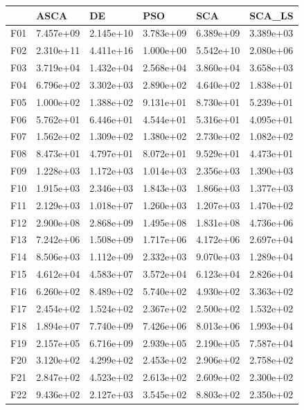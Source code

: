 \begin{tabular}{llllll}
\toprule
{} &       ASCA &         DE &        PSO &        SCA &     SCA\_LS \\
\midrule
F01  &  7.457e+09 &  2.145e+10 &  3.783e+09 &  6.389e+09 &  3.389e+03 \\
F02  &  2.310e+11 &  4.411e+16 &  1.000e+00 &  5.542e+10 &  2.080e+06 \\
F03  &  3.719e+04 &  1.432e+04 &  2.568e+04 &  3.860e+04 &  3.658e+03 \\
F04  &  6.796e+02 &  3.302e+03 &  2.890e+02 &  4.640e+02 &  1.838e+01 \\
F05  &  1.000e+02 &  1.388e+02 &  9.131e+01 &  8.730e+01 &  5.239e+01 \\
F06  &  5.762e+01 &  6.446e+01 &  4.544e+01 &  5.316e+01 &  4.095e+01 \\
F07  &  1.562e+02 &  1.309e+02 &  1.380e+02 &  2.730e+02 &  1.082e+02 \\
F08  &  8.473e+01 &  4.797e+01 &  8.072e+01 &  9.529e+01 &  4.473e+01 \\
F09  &  1.228e+03 &  1.172e+03 &  1.014e+03 &  2.356e+03 &  1.390e+03 \\
F10  &  1.915e+03 &  2.346e+03 &  1.843e+03 &  1.866e+03 &  1.377e+03 \\
F11  &  2.129e+03 &  1.018e+07 &  1.260e+03 &  1.207e+03 &  1.470e+02 \\
F12  &  2.900e+08 &  2.868e+09 &  1.495e+08 &  1.831e+08 &  4.736e+06 \\
F13  &  7.242e+06 &  1.508e+09 &  1.717e+06 &  4.172e+06 &  2.697e+04 \\
F14  &  8.506e+03 &  1.112e+09 &  2.332e+03 &  9.070e+03 &  1.289e+04 \\
F15  &  4.612e+04 &  4.583e+07 &  3.572e+04 &  6.123e+04 &  2.826e+04 \\
F16  &  6.260e+02 &  8.489e+02 &  5.740e+02 &  4.930e+02 &  3.363e+02 \\
F17  &  2.454e+02 &  1.524e+02 &  2.367e+02 &  2.500e+02 &  1.532e+02 \\
F18  &  1.894e+07 &  7.740e+09 &  7.426e+06 &  8.013e+06 &  1.993e+04 \\
F19  &  2.157e+05 &  6.716e+09 &  2.939e+05 &  2.190e+05 &  7.587e+04 \\
F20  &  3.120e+02 &  4.299e+02 &  2.453e+02 &  2.906e+02 &  2.758e+02 \\
F21  &  2.847e+02 &  4.523e+02 &  2.613e+02 &  2.609e+02 &  2.300e+02 \\
F22  &  9.436e+02 &  2.127e+03 &  3.545e+02 &  8.803e+02 &  2.350e+02 \\

\end{tabular}
